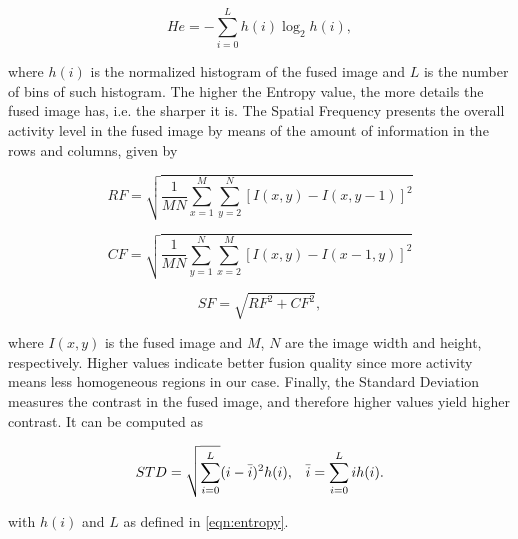 \begin{equation}
\label{eqn:entropy}
He = - \sum_{i = 0}^{L} h(i) \log_2 h(i),
\end{equation}

\noindent where $h(i)$ is the normalized histogram of the fused image and $L$ is the number of bins of such histogram. The higher the Entropy value, the more details the fused image has, i.e. the sharper it is. The Spatial Frequency presents the overall activity level in the fused image by means of the amount of information in the rows and columns, given by

\begin{equation*}
RF = \sqrt{\frac{1}{M N} 
            \sum_{x = 1}^{M}
            \sum_{y = 2}^{N}
            \left[
                I(x,y) - I(x,y - 1)
            \right]^{2}
}
\end{equation*}

\vspace{0.25cm}

\begin{equation*}
CF = \sqrt{\frac{1}{M N} 
            \sum_{y = 1}^{N}
            \sum_{x = 2}^{M}
            \left[
                I(x,y) - I(x - 1,y)
            \right]^{2}
}
\end{equation*}

\vspace{0.25cm}

\begin{equation}
\label{eqn:spatial_frequency}
SF = \sqrt{RF^{2} + CF^{2}},
\end{equation}

\noindent where $I(x,y)$ is the fused image and $M$, $N$ are the image width and height, respectively. Higher values indicate better fusion quality since more activity means less homogeneous regions in our case. Finally, the Standard Deviation measures the contrast in the fused image, and therefore higher values yield higher contrast. It can be computed as

\begin{align}
\label{eqn:standard_deviation}
STD = \sqrt{\sum_{i = 0}^{L}}(i - \Bar{i})^{2} h(i),
&&
\Bar{i} = \sum_{i = 0}^{L}i h(i).
\end{align}

\noindent with $h(i)$ and $L$ as defined in \autoref{eqn:entropy}.